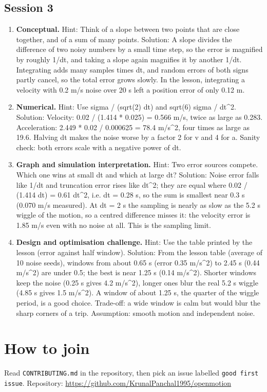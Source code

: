 \documentclass[11pt,a4paper]{article}
\begin{document}
\subsection*{Session 3}
\begin{enumerate}[nosep]
\item \textbf{Conceptual.} Hint: Think of a slope between two points that are close together, and of a sum of many points. Solution: A slope divides the difference of two noisy numbers by a small time step, so the error is magnified by roughly 1/dt, and taking a slope again magnifies it by another 1/dt. Integrating adds many samples times dt, and random errors of both signs partly cancel, so the total error grows slowly. In the lesson, integrating a velocity with 0.2 m/s noise over 20 s left a position error of only 0.12 m.
\item \textbf{Numerical.} Hint: Use sigma / (sqrt(2) dt) and sqrt(6) sigma / dt\textasciicircum{}2. Solution: Velocity: 0.02 / (1.414 * 0.025) = 0.566 m/s, twice as large as 0.283. Acceleration: 2.449 * 0.02 / 0.000625 = 78.4 m/s\textasciicircum{}2, four times as large as 19.6. Halving dt makes the noise worse by a factor 2 for v and 4 for a. Sanity check: both errors scale with a negative power of dt.
\item \textbf{Graph and simulation interpretation.} Hint: Two error sources compete. Which one wins at small dt and which at large dt? Solution: Noise error falls like 1/dt and truncation error rises like dt\textasciicircum{}2; they are equal where 0.02 / (1.414 dt) = 0.61 dt\textasciicircum{}2, i.e. dt = 0.28 s, so the sum is smallest near 0.3 s (0.070 m/s measured). At dt = 2 s the sampling is nearly as slow as the 5.2 s wiggle of the motion, so a centred difference misses it: the velocity error is 1.85 m/s even with no noise at all. This is the sampling limit.
\item \textbf{Design and optimisation challenge.} Hint: Use the table printed by the lesson (error against half window). Solution: From the lesson table (average of 10 noise seeds), windows from about 0.65 s (error 0.35 m/s\textasciicircum{}2) to 2.45 s (0.44 m/s\textasciicircum{}2) are under 0.5; the best is near 1.25 s (0.14 m/s\textasciicircum{}2). Shorter windows keep the noise (0.25 s gives 4.2 m/s\textasciicircum{}2), longer ones blur the real 5.2 s wiggle (4.85 s gives 1.5 m/s\textasciicircum{}2). A window of about 1.25 s, the quarter of the wiggle period, is a good choice. Trade-off: a wide window is calm but would blur the sharp corners of a trip. Assumption: smooth motion and independent noise.
\end{enumerate}

\section{How to join}
Read \texttt{CONTRIBUTING.md} in the repository, then pick an issue labelled \texttt{good first issue}. Repository: \url{https://github.com/KrunalPanchal1995/openmotion}
\end{document}
